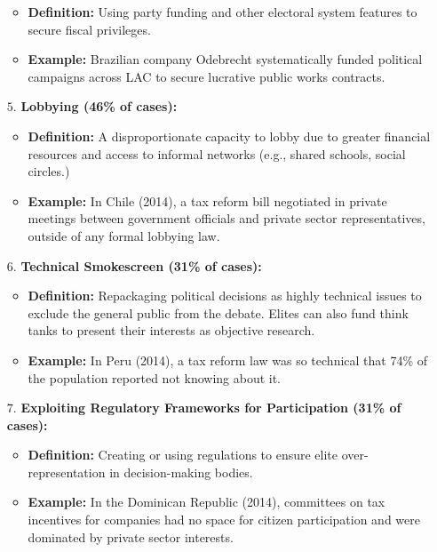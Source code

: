 \documentclass{article}
\begin{document}
\begin{itemize}
\begin{itemize}
            \item \textbf{Definition:} Using party funding and other
            electoral system features to secure fiscal privileges.
            \item \textbf{Example:} Brazilian company Odebrecht
            systematically funded political campaigns across LAC to secure
            lucrative public works contracts.
        \end{itemize}
        \item[$5$.] \textbf{Lobbying (46\% of cases):}
        \begin{itemize}
            \item \textbf{Definition:} A disproportionate capacity to lobby
            due to greater financial resources and access to informal
            networks (e.g., shared schools, social circles.)
            \item \textbf{Example:} In Chile (2014), a tax reform bill
            negotiated in private meetings between government officials and
            private sector representatives, outside of any formal lobbying law.
        \end{itemize}
        \item[$6$.] \textbf{Technical Smokescreen (31\% of cases):}
        \begin{itemize}
            \item \textbf{Definition:} Repackaging political decisions as
            highly technical issues to exclude the general public from the
            debate. Elites can also fund think tanks to present their
            interests as objective research.
            \item \textbf{Example:} In Peru (2014), a tax reform law was so
            technical that 74\% of the population reported not knowing about it.
        \end{itemize}
        \item[$7$.]
        \textbf{Exploiting Regulatory Frameworks for Participation (31\% of cases):}
        \begin{itemize}
            \item \textbf{Definition:} Creating or using regulations to
            ensure elite over-representation in decision-making bodies.
            \item \textbf{Example:} In the Dominican Republic (2014),
            committees on tax incentives for companies had no space for
            citizen participation and were dominated by private sector
            interests.

\end{itemize}
\end{itemize}
\end{document}
